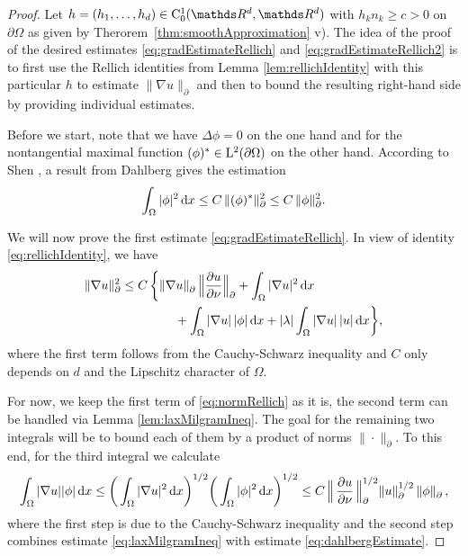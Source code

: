 \begin{proof}
  Let $h = (h_1, \dots, h_d) \in \CC_0^1(\R^d, \R^d)$ with $h_k n_k \geq c > 0$ on $\partial \Omega$ as given by Therorem~\ref{thm:smoothApproximation} v). 
  The idea of the proof of the desired estimates \eqref{eq:gradEstimateRellich} and \eqref{eq:gradEstimateRellich2} is to first use the Rellich identities from Lemma \ref{lem:rellichIdentity} with this particular $h$ to estimate $\|\nabla u\|^{}_\partial$ and then to bound the resulting right-hand side by providing individual estimates.

  Before we start, note that we have $\Delta \phi = 0$ on the one hand and for the nontangential maximal function $(\phi)^* \in \mathrm{L}^2(\partial\Omega)$ on the other hand. According to Shen \cite[p.\@~410]{Shen2012}, a result from Dahlberg \cite{dahlberg77} gives the estimation
  \begin{align}
    \label{eq:dahlbergEstimate}
    \int_\Omega |\phi|^2 \, {\operatorname{d}\!{x}} \leq C \, \|(\phi)^* \|_\partial^2 \leq C\, \|\phi\|_\partial^2.
  \end{align}

  We will now prove the first estimate \eqref{eq:gradEstimateRellich}.
  In view of identity \eqref{eq:rellichIdentity}, we have
  \begin{align}
    \label{eq:normRellich}
    \begin{alignedat}{1}
    \|\nabla u\|_\partial^2
      &\leq C \, \bigg\{ \|\nabla u\|^{}_\partial \, \Big\| \frac{\partial u}{\partial \nu} \Big\|^{}_\partial + \int_\Omega |\nabla u|^2 \, {\operatorname{d}\!{x}} \\
    &\hspace{1.5cm}+ \int_\Omega |\nabla u| \, |\phi| \, {\operatorname{d}\!{x}} + |\lambda| \int_\Omega |\nabla u|\, |u| \, {\operatorname{d}\!{x}} \bigg\},
    \end{alignedat}
  \end{align}
  where the first term follows from the Cauchy-Schwarz inequality and $C$ only depends on $d$ and the Lipschitz character of $\Omega$.

  For now, we keep the first term of \eqref{eq:normRellich} as it is, the second term can be handled via Lemma \ref{lem:laxMilgramIneq}. 
  The goal for the remaining two integrals will be to bound each of them by a product of norms $\|\cdot\|^{}_\partial$.
To this end, for the third integral we calculate
  \begin{align}
    \int_\Omega |\nabla u| |\phi| \, {\operatorname{d}\!{x}}
    \leq \bigg( \int_\Omega |\nabla u|^2 \, {\operatorname{d}\!{x}} \bigg)^{1/2} \bigg( \int_\Omega |\phi|^2 \, {\operatorname{d}\!{x}} \bigg)^{1/2}
    \leq C \, \Big\| \, \frac{\partial u}{\partial \nu}\, \Big\|_\partial^{1/2} \|u\|_\partial^{1/2} \, \|\phi\|^{}_\partial\,, \label{eq:nablaPhi}
  \end{align}
  where the first step is due to the Cauchy-Schwarz inequality and the second step combines estimate \eqref{eq:laxMilgramIneq} with estimate \eqref{eq:dahlbergEstimate}.


\end{proof}
